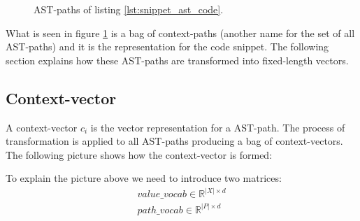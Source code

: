 \begin{figure}
 \centering
 \caption[All AST-paths for listing \ref{lst:snippet_ast_code}.]{AST-paths of listing \ref{lst:snippet_ast_code}.}
    \label{fig:AST_paths}
\end{figure}


What is seen in figure \ref{fig:AST_paths} is a bag of context-paths (another name for the set of all AST-paths) and it is the representation for the code snippet. The following section explains how these AST-paths are transformed into fixed-length vectors.

\subsection{Context-vector}

A context-vector $c_i$ is the vector representation for a AST-path. The process of transformation is applied to all AST-paths producing a bag of context-vectors.
The following picture shows how the context-vector is formed:

\begin{center}
\end{center}

To explain the picture above we need to introduce two matrices:
\begin{align*} 
 value\_vocab \in \mathbb{R}^{|X| \times d}
\\
    path\_vocab \in \mathbb{R}^{|P| \times d}
\end{align*}

